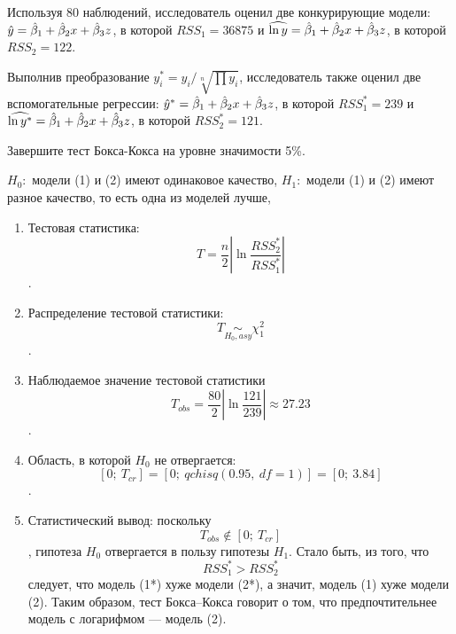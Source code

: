 \begin{problem}
Используя 80 наблюдений, исследователь оценил две конкурирующие модели: $\hat{y}=\hat{\beta}_1+\hat{\beta}_2 x +\hat{\beta}_3 z$, в которой $RSS_1=36875$ и $\widehat{\ln y}=\hat{\beta}_1+\hat{\beta}_2 x +\hat{\beta}_3 z$, в которой $RSS_2=122$.

Выполнив преобразование $y^*_i=y_i/\sqrt[n]{\prod y_i}$, исследователь также оценил две вспомогательные регрессии: $\hat{y}^*=\hat{\beta}_1+\hat{\beta}_2 x +\hat{\beta}_3 z$, в которой $RSS^*_1=239$ и $\widehat{\ln y^*}=\hat{\beta}_1+\hat{\beta}_2 x +\hat{\beta}_3 z$, в которой $RSS^*_2=121$.

Завершите тест Бокса-Кокса на уровне значимости 5\%.


\begin{sol}
$H_0:$ модели (1) и (2) имеют одинаковое качество,
$H_1:$ модели (1) и (2) имеют разное качество, то есть одна из моделей лучше,
\begin{enumerate}
\item Тестовая статистика: \[T=\frac{n}{2}\left| \ln \frac{RSS_{2}^{*}}{RSS_{1}^{*}} \right|\].
\item Распределение тестовой статистики: \[T\underset{H_0, asy}{\sim} \chi^2_1 \].
\item Наблюдаемое значение тестовой статистики \[{{T}_{obs}}=\frac{80}{2}\left| \ln \frac{121}{239} \right|\approx \text{27.23}\].
\item Область, в которой $H_0$ не отвергается: \[[0;\ {{T}_{cr}}]=[0;\ qchisq(0.95,\ df=1)]=[0;\ \text{3.84}]\].
\item Статистический вывод: поскольку \[{{T}_{obs}}\notin [0;\ {{T}_{cr}}]\], гипотеза $H_0$ отвергается в пользу гипотезы $H_1$. Стало быть, из того, что \[RSS_{1}^{*}>RSS_{2}^{*}\] следует, что модель (1*) хуже модели (2*), а значит, модель (1) хуже модели (2). Таким образом, тест Бокса–Кокса говорит о том, что предпочтительнее модель с логарифмом — модель (2).
\end{enumerate}

\end{sol}
\end{problem}


